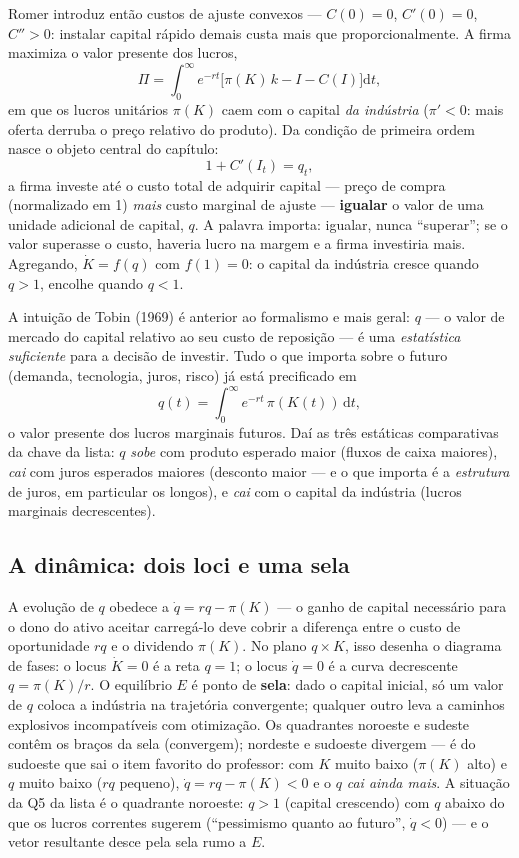 \documentclass[12pt, a4paper]{article}
\newcommand{\dif}{\mathrm{d}}
\begin{document}
Romer introduz então custos de ajuste convexos --- $C(0)=0$, $C'(0)=0$,
$C''>0$: instalar capital rápido demais custa mais que proporcionalmente. A
firma maximiza o valor presente dos lucros,
\[
\Pi = \int_{0}^{\infty} e^{-rt}\bigl[\pi(K)\,k - I - C(I)\bigr]\dif t,
\]
em que os lucros unitários $\pi(K)$ caem com o capital \emph{da indústria}
($\pi'<0$: mais oferta derruba o preço relativo do produto). Da condição de
primeira ordem nasce o objeto central do capítulo:
\[
1 + C'(I_t) = q_t,
\]
a firma investe até o custo total de adquirir capital --- preço de compra
(normalizado em 1) \emph{mais} custo marginal de ajuste --- \textbf{igualar} o
valor de uma unidade adicional de capital, $q$. A palavra importa: igualar,
nunca ``superar''; se o valor superasse o custo, haveria lucro na margem e a
firma investiria mais. Agregando, $\dot K = f(q)$ com $f(1)=0$: o capital da
indústria cresce quando $q>1$, encolhe quando $q<1$.

A intuição de Tobin (1969) é anterior ao formalismo e mais geral: $q$ ---
o valor de mercado do capital relativo ao seu custo de reposição --- é uma
\emph{estatística suficiente} para a decisão de investir. Tudo o que importa
sobre o futuro (demanda, tecnologia, juros, risco) já está precificado em
\[
q(t) = \int_{0}^{\infty} e^{-rt}\,\pi(K(t))\,\dif t,
\]
o valor presente dos lucros marginais futuros. Daí as três estáticas
comparativas da chave da lista: $q$ \emph{sobe} com produto esperado maior
(fluxos de caixa maiores), \emph{cai} com juros esperados maiores (desconto
maior --- e o que importa é a \emph{estrutura} de juros, em particular os
longos), e \emph{cai} com o capital da indústria (lucros marginais
decrescentes).

\subsection{A dinâmica: dois loci e uma sela}

A evolução de $q$ obedece a $\dot q = rq - \pi(K)$ --- o ganho de capital
necessário para o dono do ativo aceitar carregá-lo deve cobrir a diferença
entre o custo de oportunidade $rq$ e o dividendo $\pi(K)$. No plano
$q \times K$, isso desenha o diagrama de fases: o locus $\dot K = 0$ é a reta
$q=1$; o locus $\dot q = 0$ é a curva decrescente $q = \pi(K)/r$. O equilíbrio
$E$ é ponto de \textbf{sela}: dado o capital inicial, só um valor de $q$
coloca a indústria na trajetória convergente; qualquer outro leva a caminhos
explosivos incompatíveis com otimização. Os quadrantes noroeste e sudeste
contêm os braços da sela (convergem); nordeste e sudoeste divergem --- é do
sudoeste que sai o item favorito do professor: com $K$ muito baixo
($\pi(K)$ alto) e $q$ muito baixo ($rq$ pequeno), $\dot q = rq - \pi(K) < 0$
e o $q$ \emph{cai ainda mais}. A situação da Q5 da lista é o quadrante
noroeste: $q>1$ (capital crescendo) com $q$ abaixo do que os lucros correntes
sugerem (``pessimismo quanto ao futuro'', $\dot q<0$) --- e o vetor resultante
desce pela sela rumo a $E$.
\end{document}

